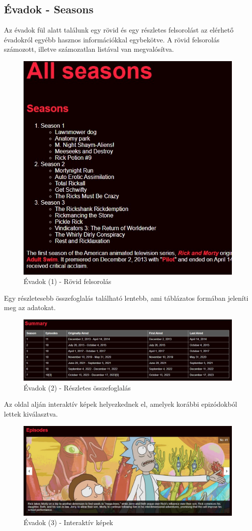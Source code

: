 \documentclass[12pt, titlepage]{article}
\begin{document}
\pagebreak

\subsection{Évadok - Seasons}
Az évadok fül alatt találunk egy rövid és egy részletes felsorolást az elérhető évadokról egyébb hasznos információkkal egybekötve.
A rövid felsorolás számozott, illetve számozatlan listával van megvalósítva.

\begin{figure}[!h]
	\centering
	\includegraphics[width=0.6\linewidth]{images/seasons/1.jpg}
	\caption{Évadok (1) - Rövid felsorolás} 
\end{figure}

Egy részletesebb összefoglalás található lentebb, ami táblázatos formában jeleníti meg az adatokat.

\begin{figure}[!h]
	\centering
	\includegraphics[width=\linewidth]{images/seasons/2.jpg}
	\caption{Évadok (2) - Részletes összefoglalás} 
\end{figure}

Az oldal alján interaktív képek helyezkednek el, amelyek korábbi epizódokból lettek kiválasztva.

\begin{figure}[!h]
	\centering
	\includegraphics[width=\linewidth]{images/seasons/3.jpg}
	\caption{Évadok (3) - Interaktív képek}
\end{figure}
\end{document}
